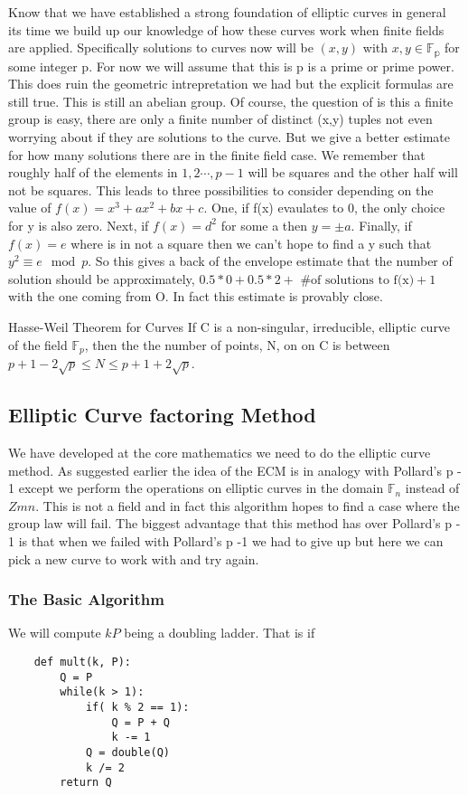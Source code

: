 \documentclass{article}
\begin{document}
Know that we have established a strong foundation of elliptic curves in general its time we build up our knowledge of how these curves work when finite fields are applied. Specifically solutions to curves now will be $(x,y)$ with $x, y \in \mathbb{F_p}$ for some integer p. For now we will assume that this is p is a prime or prime power.  This does ruin the geometric intrepretation we had but the explicit formulas are still true. This is still an abelian group.  Of course, the question of is this a finite group is easy, there are only a finite number of  distinct (x,y) tuples not even worrying about if they are solutions to the curve. 
But we give a better estimate for how many solutions there are in the finite field case. We remember that roughly half of the elements in $1, 2 \cdots , p - 1$ will be squares and the other half will not be squares. This leads to three possibilities to consider depending on the value of $f(x) = x^3 + ax^2 + bx  +c $. One, if f(x) evaulates to 0, the only choice for y is also zero. Next, if $f(x) = d^2$ for some a then $y = \pm a$. Finally, if $f(x) = e$ where is in not a square then we can't hope to find a y such that $y^2 \equiv  e \mod p$. So this gives a back of the envelope estimate that the number of solution should be approximately, $0.5 * 0 + 0.5 * 2 + \text{ \# of solutions to f(x)} + 1$ with the one coming from O. In fact this estimate is provably close.
\begin{theorem}{Hasse-Weil Theorem for Curves}
    If C is a non-singular, irreducible, elliptic curve of the field $\mathbb{F}_p$, then the the number of points, N, on on C is between $p + 1 - 2 \sqrt{p} \leq N \leq p + 1 + 2 \sqrt{p}$. 
\end{theorem}

\subsection{Elliptic Curve factoring Method}

We have developed at the core mathematics we need to do the elliptic curve method. As suggested earlier the idea of the ECM is in analogy with Pollard's p - 1 except we perform the operations on elliptic curves in the domain $\mathbb{F}_n$ instead of $Zm{n}$. This is not a field and in fact this algorithm hopes to find a case where the group law will fail. The biggest advantage that this method has over Pollard's p - 1 is that when we failed with Pollard's p -1 we had to give up but here we can pick a new curve to work with and try again. 
\subsubsection{The Basic Algorithm}
We will compute $k P$ being a doubling ladder. That is if 
\begin{verbatim}
    def mult(k, P):
        Q = P
        while(k > 1):
            if( k % 2 == 1):
                Q = P + Q
                k -= 1
            Q = double(Q)
            k /= 2
        return Q
\end{verbatim}
\end{document}
